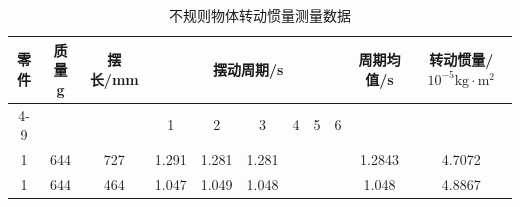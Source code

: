 \documentclass{article}
\begin{document}
\begin{table}[h!]
    \centering
    \renewcommand{\arraystretch}{1.5}
    \setlength{\tabcolsep}{8pt}
    \begin{tabular}{|c|c|c|c|c|c|c|c|c|c|c|}
    \hline
    \multirow{3}{*}{\textbf{零件}} & \multirow{3}{*}{\textbf{质量 g}} & \multirow{3}{*}{\textbf{摆长/mm}} & \multicolumn{6}{c|}{\textbf{摆动周期/s}} & \multirow{3}{*}{\textbf{周期均值/s}} & \multirow{3}{*}{\textbf{转动惯量/ $ \mathrm{10^{-5}kg \cdot m^2} $}}  \\ \cline{4-9}
    & & & 1 & 2 & 3 & 4 & 5 & 6 & & \\ \hline
    1 & 644 & 727 & 1.291 & 1.281 & 1.281 &  &  &  & 1.2843 & 4.7072 \\ \hline
    1 & 644 & 464 & 1.047 & 1.049 & 1.048 &  &  &  & 1.048 & 4.8867 \\ \hline
    \end{tabular}
    \caption{不规则物体转动惯量测量数据}
    \label{tab:irregular_data}
\end{table}
\end{document}
